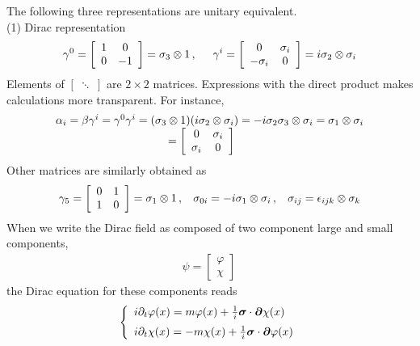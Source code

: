 The following three representations are unitary equivalent.\\
(1) Dirac representation\\
\begin{eqnarray}
\gamma^0
=
\left[
\begin{array}{cc}
1 & 0 \\ 0 & -1
\end{array}
\right]
= \sigma_3 \otimes 1
\,,
\hspace{5mm}
\gamma^i
=
\left[
\begin{array}{cc}
0 & \sigma_i \\ -\sigma_i & 0
\end{array}
\right]
=
i\sigma_2 \otimes \sigma_i
\end{eqnarray}
Elements of $\left[\;\ddots\;\right]$ are $2 \times 2$ matrices.
Expressions with the direct product makes calculations more transparent. 
For instance,
\begin{eqnarray}
\begin{array}{l}
\alpha_i = \beta \gamma^i = \gamma^0 \gamma^i
= (\sigma_3 \otimes 1)(i\sigma_2 \otimes \sigma_i)
= -i \sigma_2 \sigma_3 \otimes \sigma_i
= \sigma_1 \otimes \sigma_i
\\
\hspace{35mm}
=
\left[
\begin{array}{cc}
0 & \sigma_i
\\
\sigma_i & 0
\end{array}
\right]
\end{array}
\end{eqnarray}
Other matrices are similarly obtained as
\begin{eqnarray}
\gamma_5
=
\left[
\begin{array}{cc}
0 & 1 \\ 1 & 0
\end{array}
\right]
= \sigma_1 \otimes 1\,,
\hspace{3mm}
\sigma_{0 i} = -i  \sigma_1 \otimes \sigma_i\,,
\hspace{3mm}
\sigma_{i j} = \epsilon_{ijk} \otimes \sigma_k
\end{eqnarray}
When we write the Dirac field as composed of two component 
large and small components,
\begin{eqnarray}
\psi =
\left[
\begin{array}{c}
\varphi \\ \chi
\end{array}
\right]\,
\end{eqnarray}
the Dirac equation for these components reads
\begin{eqnarray}
\left\{
\begin{array}{l}
i \partial_t \varphi(x)
=
m \varphi(x) + \frac{1}{i} \bld{\sigma} \cdot \bld{\partial} \chi(x)
\vspace{2mm}
\\
i \partial_t \chi(x)
=
-m \chi(x) + \frac{1}{i} \bld{\sigma} \cdot \bld{\partial} \varphi(x)
\end{array}
\right.
\end{eqnarray}
\\

